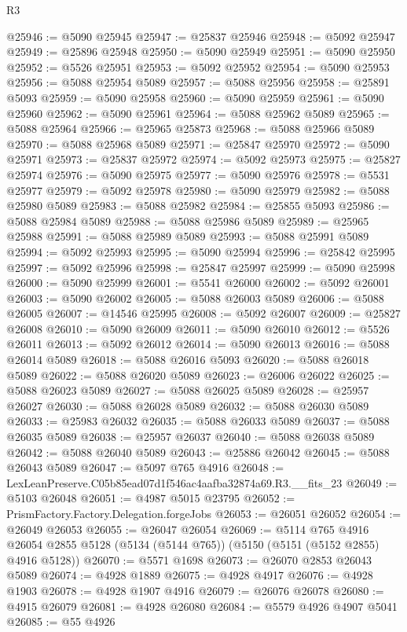 \begin{lexlean}{R3}
\begin{coremodule}
@25946 := @5090 @25945
@25947 := @25837 @25946
@25948 := @5092 @25947
@25949 := @25896 @25948
@25950 := @5090 @25949
@25951 := @5090 @25950
@25952 := @5526 @25951
@25953 := @5092 @25952
@25954 := @5090 @25953
@25956 := @5088 @25954 @5089
@25957 := @5088 @25956
@25958 := @25891 @5093
@25959 := @5090 @25958
@25960 := @5090 @25959
@25961 := @5090 @25960
@25962 := @5090 @25961
@25964 := @5088 @25962 @5089
@25965 := @5088 @25964
@25966 := @25965 @25873
@25968 := @5088 @25966 @5089
@25970 := @5088 @25968 @5089
@25971 := @25847 @25970
@25972 := @5090 @25971
@25973 := @25837 @25972
@25974 := @5092 @25973
@25975 := @25827 @25974
@25976 := @5090 @25975
@25977 := @5090 @25976
@25978 := @5531 @25977
@25979 := @5092 @25978
@25980 := @5090 @25979
@25982 := @5088 @25980 @5089
@25983 := @5088 @25982
@25984 := @25855 @5093
@25986 := @5088 @25984 @5089
@25988 := @5088 @25986 @5089
@25989 := @25965 @25988
@25991 := @5088 @25989 @5089
@25993 := @5088 @25991 @5089
@25994 := @5092 @25993
@25995 := @5090 @25994
@25996 := @25842 @25995
@25997 := @5092 @25996
@25998 := @25847 @25997
@25999 := @5090 @25998
@26000 := @5090 @25999
@26001 := @5541 @26000
@26002 := @5092 @26001
@26003 := @5090 @26002
@26005 := @5088 @26003 @5089
@26006 := @5088 @26005
@26007 := @14546 @25995
@26008 := @5092 @26007
@26009 := @25827 @26008
@26010 := @5090 @26009
@26011 := @5090 @26010
@26012 := @5526 @26011
@26013 := @5092 @26012
@26014 := @5090 @26013
@26016 := @5088 @26014 @5089
@26018 := @5088 @26016 @5093
@26020 := @5088 @26018 @5089
@26022 := @5088 @26020 @5089
@26023 := @26006 @26022
@26025 := @5088 @26023 @5089
@26027 := @5088 @26025 @5089
@26028 := @25957 @26027
@26030 := @5088 @26028 @5089
@26032 := @5088 @26030 @5089
@26033 := @25983 @26032
@26035 := @5088 @26033 @5089
@26037 := @5088 @26035 @5089
@26038 := @25957 @26037
@26040 := @5088 @26038 @5089
@26042 := @5088 @26040 @5089
@26043 := @25886 @26042
@26045 := @5088 @26043 @5089
@26047 := @5097 @765 @4916
@26048 := LexLeanPreserve.C05b85ead07d1f546ac4aafba32874a69.R3.__fits_23
@26049 := @5103 @26048
@26051 := @4987 @5015 @23795
@26052 := PrismFactory.Factory.Delegation.forgeJobs
@26053 := @26051 @26052
@26054 := @26049 @26053
@26055 := @26047 @26054
@26069 := @5114
    @765
    @4916
    @26054
    @2855
    @5128
    (@5134 (@5144 @765))
    (@5150 (@5151 (@5152 @2855) @4916 @5128))
@26070 := @5571 @1698
@26073 := @26070 @2853 @26043 @5089
@26074 := @4928 @1889
@26075 := @4928 @4917
@26076 := @4928 @1903
@26078 := @4928 @1907 @4916
@26079 := @26076 @26078
@26080 := @4915 @26079
@26081 := @4928 @26080
@26084 := @5579 @4926 @4907 @5041
@26085 := @55 @4926

\end{coremodule}
\end{lexlean}
